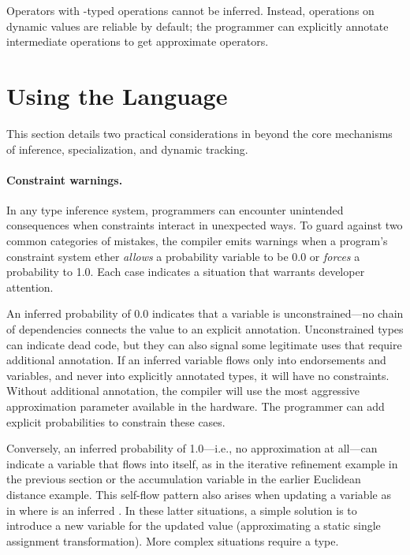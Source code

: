 {Operators with -typed operations cannot be
inferred.
Instead, operations on dynamic values are reliable by default; the programmer
can explicitly annotate intermediate operations to get approximate operators.



\section{Using the Language}
\label{decaf:sec:practice}

This section details two practical considerations in \lang beyond the core
mechanisms of inference, specialization, and dynamic tracking.

\paragraph{Constraint warnings.}
\label{decaf:sec:warn}

In any type inference system, programmers can encounter unintended
consequences when constraints interact in unexpected ways.
To guard against two common categories of mistakes, the \lang compiler emits
warnings when a program's constraint system ether \emph{allows} a probability
variable to be 0.0 or \emph{forces} a probability to 1.0.
Each case indicates a situation that warrants developer attention.

An inferred probability of 0.0 indicates that a variable is unconstrained---no
chain of dependencies connects the value to an explicit annotation.
Unconstrained types can indicate dead code, but they can also signal some
legitimate uses that require additional annotation.
If an inferred variable flows only into endorsements and 
variables, and never into explicitly annotated types, it will have no
constraints.
Without additional annotation, the compiler will use the most aggressive
approximation parameter available in the hardware.
The programmer can add explicit probabilities to constrain these cases.

Conversely, an inferred probability of 1.0---i.e., no approximation at
all---can indicate a variable that flows into itself, as in the iterative
refinement example in the previous section or the  accumulation
variable in the earlier Euclidean distance example.
This self-flow pattern also arises when updating a variable as in
 where  is an inferred .
In these latter situations, a simple solution is to introduce a new
variable for the updated value (approximating a static single assignment
transformation).
More complex situations require a  type.


}
